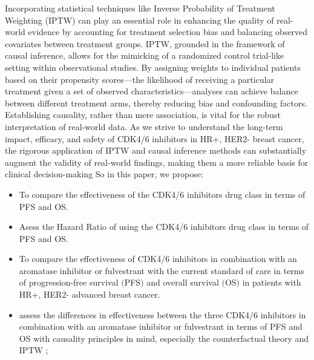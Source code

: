 Incorporating statistical techniques like Inverse Probability of Treatment Weighting (IPTW) can play an essential role in enhancing the quality of real-world evidence by accounting for treatment selection bias and balancing observed covariates between treatment groups. IPTW, grounded in the framework of causal inference, allows for the mimicking of a randomized control trial-like setting within observational studies. By assigning weights to individual patients based on their propensity scores—the likelihood of receiving a particular treatment given a set of observed characteristics—analyses can achieve balance between different treatment arms, thereby reducing bias and confounding factors. Establishing causality, rather than mere association, is vital for the robust interpretation of real-world data. As we strive to understand the long-term impact, efficacy, and safety of CDK4/6 inhibitors in HR+, HER2- breast cancer, the rigorous application of IPTW and causal inference methods can substantially augment the validity of real-world findings, making them a more reliable basis for clinical decision-making \cite{austinIntroductionPropensityScore2011,austinUsePropensityScore2014}
So in this paper, we propose:
\begin{itemize}
    \item To compare the effectiveness of the CDK4/6 inhibitors drug class in terms of PFS and OS.
\item Asess the Hazard Ratio of using the CDK4/6 inhibitors drug class in terms of PFS and OS.
    \item To compare the effectiveness of CDK4/6 inhibitors in combination with an aromatase inhibitor or fulvestrant with the current standard of care in terms of progression-free survival $($PFS$)$ and overall survival $($OS$)$ in patients with HR+, HER2- advanced breast cancer.
    \item assess the differences in effectiveness between the three CDK4/6 inhibitors in combination with an aromatase inhibitor or fulvestrant in terms of PFS and OS with causality principles in mind, especially the counterfactual theory and IPTW ;
\end{itemize}
